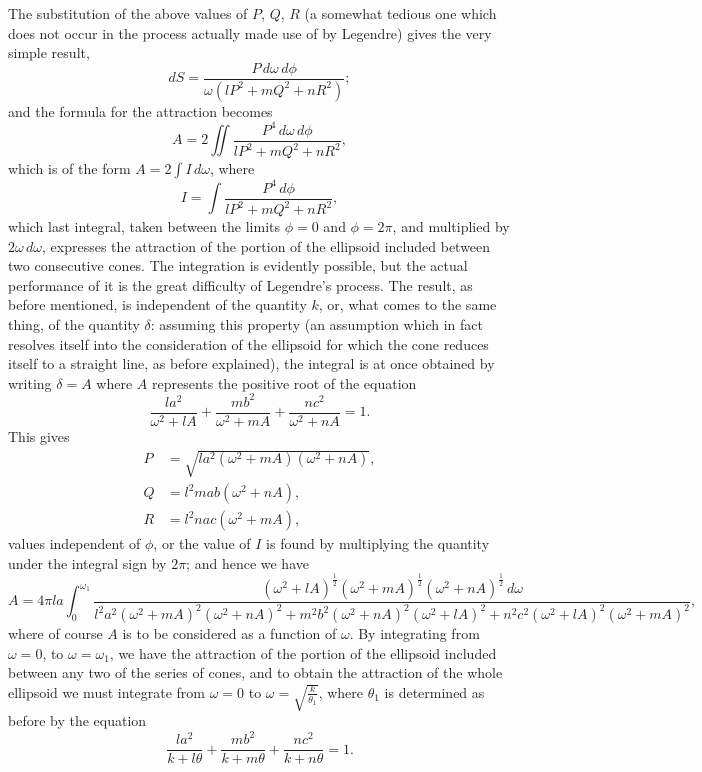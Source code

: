 \documentclass[11pt,a4paper]{article}
\theoremstyle{definition}
\begin{document}
The substitution of the above values of $P$, $Q$, $R$ (a somewhat tedious one which does not occur in the process actually made use of by Legendre) gives the very simple result,
\[
dS = \frac{P\, d\omega\, d\phi}{\omega(lP^{2} + mQ^{2} + nR^{2})};
\]
and the formula for the attraction becomes
\[
A = 2\iint \frac{P^{4}\, d\omega\, d\phi}{lP^{2} + mQ^{2} + nR^{2}},
\]
which is of the form $A = 2\int I\, d\omega$, where
\[
I = \int \frac{P^{4}\, d\phi}{lP^{2} + mQ^{2} + nR^{2}},
\]
which last integral, taken between the limits $\phi = 0$ and $\phi = 2\pi$, and multiplied by $2\omega\, d\omega$, expresses the attraction of the portion of the ellipsoid included between two consecutive cones. The integration is evidently possible, but the actual performance of it is the great difficulty of Legendre's process. The result, as before mentioned, is independent of the quantity $k$, or, what comes to the same thing, of the quantity $\delta$: assuming this property (an assumption which in fact resolves itself into the consideration of the ellipsoid for which the cone reduces itself to a straight line, as before explained), the integral is at once obtained by writing $\delta = A$ where $A$ represents the positive root of the equation
\[
\frac{la^{2}}{\omega^{2} + lA} + \frac{mb^{2}}{\omega^{2} + mA} + \frac{nc^{2}}{\omega^{2} + nA} = 1.
\]
This gives
\begin{align*}
P &= \sqrt{la^{2}(\omega^{2} + mA)(\omega^{2} + nA)}, \\
Q &= l^{2}mab(\omega^{2} + nA), \\
R &= l^{2}nac(\omega^{2} + mA),
\end{align*}
values independent of $\phi$, or the value of $I$ is found by multiplying the quantity under the integral sign by $2\pi$; and hence we have
\[
A = 4\pi la \int_{0}^{\omega_{1}} \frac{(\omega^{2} + lA)^{\frac{1}{2}}(\omega^{2} + mA)^{\frac{1}{2}}(\omega^{2} + nA)^{\frac{1}{2}}\, d\omega}{l^{2}a^{2}(\omega^{2} + mA)^{2}(\omega^{2} + nA)^{2} + m^{2}b^{2}(\omega^{2} + nA)^{2}(\omega^{2} + lA)^{2} + n^{2}c^{2}(\omega^{2} + lA)^{2}(\omega^{2} + mA)^{2}},
\]
where of course $A$ is to be considered as a function of $\omega$. By integrating from $\omega = 0$, to $\omega = \omega_{1}$, we have the attraction of the portion of the ellipsoid included between any two of the series of cones, and to obtain the attraction of the whole ellipsoid we must integrate from $\omega = 0$ to $\omega = \sqrt{\frac{k}{\theta_{1}}}$, where $\theta_{1}$ is determined as before by the equation
\[
\frac{la^{2}}{k + l\theta} + \frac{mb^{2}}{k + m\theta} + \frac{nc^{2}}{k + n\theta} = 1.
\]
\end{document}

